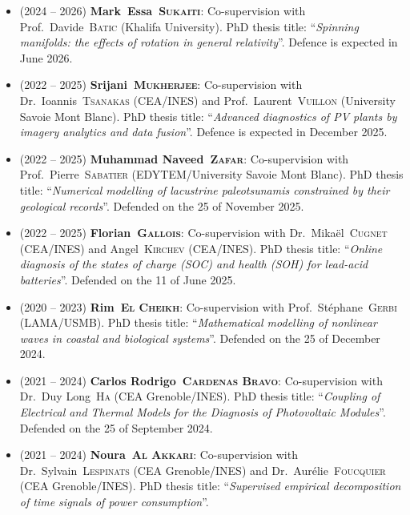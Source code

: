 \documentclass[final, a4paper, oneside, 12pt]{article}
\numberwithin{equation}{section}
\begin{document}
\begin{itemize}

  \item (2024 -- 2026) \textbf{Mark~Essa~\textsc{Sukaiti}}: Co-supervision with Prof.~Davide~\textsc{Batic} (Khalifa University). PhD thesis title: ``\textit{Spinning manifolds: the effects of rotation in general relativity}''. Defence is expected in June 2026.

  \item (2022 -- 2025) \textbf{Srijani~\textsc{Mukherjee}}: Co-supervision with Dr.~Ioannis~\textsc{Tsanakas} (CEA/INES) and Prof.~Laurent~\textsc{Vuillon} (University Savoie Mont Blanc). PhD thesis title: ``\textit{Advanced diagnostics of PV plants by imagery analytics and data fusion}''. Defence is expected in December 2025.

  \item (2022 -- 2025) \textbf{Muhammad Naveed~\textsc{Zafar}}: Co-supervision with Prof.~Pierre~\textsc{Sabatier} (EDYTEM/University Savoie Mont Blanc). PhD thesis title: ``\textit{Numerical modelling of lacustrine paleotsunamis constrained by their geological records}''. Defended on the 25 of November 2025.

  \item (2022 -- 2025) \textbf{Florian~\textsc{Gallois}}: Co-supervision with Dr.~Mika\"el~\textsc{Cugnet} (CEA/INES) and Angel~\textsc{Kirchev} (CEA/INES). PhD thesis title: ``\textit{Online diagnosis of the states of charge (SOC) and health (SOH) for lead-acid batteries}''. Defended on the 11 of June 2025.

  \item (2020 -- 2023) \textbf{Rim~\textsc{El Cheikh}}: Co-supervision with Prof.~St\'ephane~\textsc{Gerbi} (LAMA/USMB). PhD thesis title: ``\textit{Mathematical modelling of nonlinear waves in coastal and biological systems}''. Defended on the 25 of December 2024.

  \item (2021 -- 2024) \textbf{Carlos Rodrigo~\textsc{Cardenas Bravo}}: Co-supervision with Dr.~Duy Long~\textsc{Ha} (CEA Grenoble/INES). PhD thesis title: ``\textit{Coupling of Electrical and Thermal Models for the Diagnosis of Photovoltaic Modules}''. Defended on the 25 of September 2024.

  \item (2021 -- 2024) \textbf{Noura~\textsc{Al Akkari}}: Co-supervision with Dr.~Sylvain~\textsc{Lespinats} (CEA Grenoble/INES) and Dr.~Aur\'elie~\textsc{Foucquier} (CEA Grenoble/INES). PhD thesis title: ``\textit{Supervised empirical decomposition of time signals of power consumption}''.
  

\end{itemize}
\end{document}
